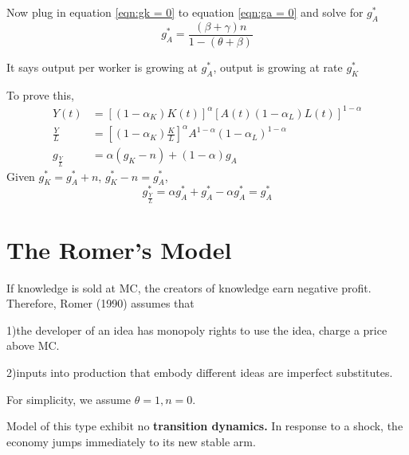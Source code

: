 \documentclass[12pt]{article}
\begin{document}
{Now plug in equation \eqref{eqn:gk = 0} to equation \eqref{eqn:ga = 0} and solve for
$ g_{A}^{*} $
\begin{equation*}
g_{A}^{*} = \frac{(\beta + \gamma)n}{1 - (\theta + \beta)}
\end{equation*}

It says output per worker is growing at $ g_{A}^{*} $, output is growing at rate
$ g_{K}^{*} $

To prove this, 
\begin{align*}
Y(t) &= \left[ (1 - \alpha_{K}) K(t) \right] ^{\alpha}
\left[ A(t)(1 - \alpha_{L})L(t) \right] ^{1 - \alpha}\\
\frac{Y}{L} &= \left[ (1 - \alpha_{K})\frac{K}{L} \right]^{\alpha} 
A^{1 - \alpha}(1 - \alpha_{L})^{1 - \alpha}\\
g_{\frac{Y}{L}}&= \alpha(g_{K} - n) + (1 - \alpha)g_{A}
\end{align*}
Given $ g_{K}^{*} = g_{A}^{*} + n $, $ g_{K}^{*} - n = g_{A}^{*} $,
\begin{equation*}
g_{\frac{Y}{L}}^{*}= \alpha g_{A}^{*} + g_{A}^{*} - \alpha g_{A}^{*}= g_{A}^{*}
\end{equation*}




\section{The Romer's Model}
If knowledge is sold at MC, the creators of knowledge earn negative profit. Therefore,
Romer (1990) assumes that 

1)the developer of an idea has monopoly rights to use the idea, charge a price above MC.

2)inputs into production that embody different ideas are imperfect substitutes.

For simplicity, we assume $ \theta = 1, n = 0 $.

Model of this type exhibit no {\textbf {transition dynamics.}} In response to a shock,
the economy jumps immediately to its new stable arm.


}
\end{document}
